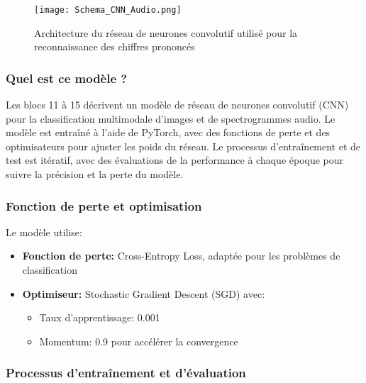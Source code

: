 \documentclass{article}
\begin{document}
\begin{figure}[H]
    \centering
    \texttt{[image: Schema\_CNN\_Audio.png]}
    \caption{Architecture du réseau de neurones convolutif utilisé pour la reconnaissance des chiffres prononcés}
    \label{fig:cnn_archi}
\end{figure}

\subsubsection{Quel est ce modèle ?}
\label{subsubsec:quel_modele}

Les blocs 11 à 15 décrivent un modèle de réseau de neurones convolutif (CNN) pour la classification multimodale d'images et de spectrogrammes audio. Le modèle est entraîné à l'aide de PyTorch, avec des fonctions de perte et des optimisateurs pour ajuster les poids du réseau. Le processus d'entraînement et de test est itératif, avec des évaluations de la performance à chaque époque pour suivre la précision et la perte du modèle.

\subsubsection{Fonction de perte et optimisation}
\label{subsubsec:loss_optim}

Le modèle utilise:
\begin{itemize}
    \item \textbf{Fonction de perte:} Cross-Entropy Loss, adaptée pour les problèmes de classification
    \item \textbf{Optimiseur:} Stochastic Gradient Descent (SGD) avec:
    \begin{itemize}
        \item Taux d'apprentissage: 0.001
        \item Momentum: 0.9 pour accélérer la convergence
    \end{itemize}
\end{itemize}

\subsubsection{Processus d'entraînement et d'évaluation}
\label{subsec:training}
\end{document}
